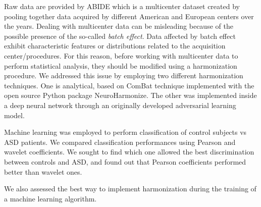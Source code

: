 \documentclass[11pt]{report}
\begin{document}


Raw data are provided by ABIDE which is a multicenter dataset created by pooling together data acquired by different American and European centers over the years.
Dealing with multicenter data can be misleading because of the possible presence of the so-called \emph{batch effect}. 
Data affected by batch effect exhibit characteristic features or distributions related to the acquisition center/procedures.
For this reason, before working with multicenter data to perform statistical analysis, they should be modified using a harmonization procedure.
We addressed this issue by employing two different harmonization techniques.
One is analytical, based on ComBat technique implemented with the open source Python package NeuroHarmonize.  
The other was implemented inside a deep neural network through an originally developed adversarial learning model.

Machine learning was employed to perform classification of control subjects vs ASD patients. 
We compared classification performances using Pearson and wavelet coefficients. 
We sought to find which one allowed the best discrimination between controls and ASD, and found out that Pearson coefficients performed better than wavelet ones.

We also assessed the best way to implement harmonization during the training of a machine learning algorithm.
\end{document}
